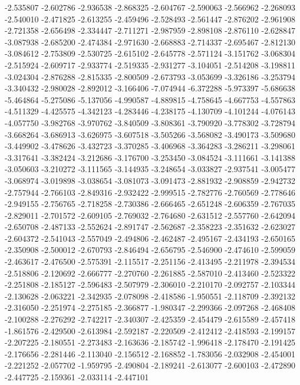 -2.535807
-2.602786
-2.936538
-2.868325
-2.604767
-2.590063
-2.566962
-2.268093
-2.540010
-2.471825
-2.613255
-2.459496
-2.528493
-2.561447
-2.876202
-2.961908
-2.721358
-2.656498
-2.334447
-2.711271
-2.987959
-2.898108
-2.876110
-2.628847
-3.087938
-2.685200
-2.474384
-2.971630
-2.668883
-2.714337
-2.695467
-2.812130
-3.084612
-2.753809
-2.530725
-2.615102
-2.645778
-2.571124
-3.151762
-3.068304
-2.515924
-2.609717
-2.933774
-2.519335
-2.931277
-3.104051
-2.514208
-3.198811
-3.024304
-2.876288
-2.815335
-2.800509
-2.673793
-3.053699
-3.326186
-3.253794
-3.340432
-2.980028
-2.892012
-3.166406
-7.074944
-6.372288
-5.973397
-5.686638
-5.464864
-5.275086
-5.137056
-4.990587
-4.889815
-4.758645
-4.667753
-4.557863
-4.511329
-4.425575
-4.342123
-4.283446
-4.238175
-4.130709
-4.101244
-4.076143
-4.057750
-3.982768
-3.970762
-3.840509
-3.808361
-3.790920
-3.778302
-3.728794
-3.668264
-3.686913
-3.626975
-3.607518
-3.505266
-3.568082
-3.490173
-3.509680
-3.449902
-3.478626
-3.432723
-3.370285
-3.406968
-3.364283
-3.286211
-3.298061
-3.317641
-3.382424
-3.212686
-3.176700
-3.253450
-3.084524
-3.111661
-3.141388
-3.050603
-3.210272
-3.111565
-3.144935
-3.248654
-3.033827
-2.937541
-3.005477
-3.068974
-3.019898
-3.038654
-3.081073
-3.091473
-2.881932
-2.908859
-2.942732
-2.757944
-2.766103
-2.849316
-2.932422
-2.999515
-2.782776
-2.760569
-2.778646
-2.949155
-2.756765
-2.718258
-2.730386
-2.666465
-2.651248
-2.606359
-2.767035
-2.829011
-2.701572
-2.609105
-2.769032
-2.764680
-2.631512
-2.557760
-2.642094
-2.650708
-2.487133
-2.552624
-2.891747
-2.562687
-2.358223
-2.351632
-2.623027
-2.604372
-2.541043
-2.557049
-2.494806
-2.462487
-2.495167
-2.434193
-2.650165
-2.350908
-2.500012
-2.670793
-2.846494
-2.656795
-2.546900
-2.474610
-2.599059
-2.463617
-2.476500
-2.575391
-2.115517
-2.251156
-2.413495
-2.211978
-2.394534
-2.518806
-2.120692
-2.666777
-2.270760
-2.261885
-2.587010
-2.413460
-2.523322
-2.251808
-2.185127
-2.596483
-2.507979
-2.306010
-2.210170
-2.092757
-2.103344
-2.130628
-2.063221
-2.342935
-2.078098
-2.418586
-1.950551
-2.118709
-2.392132
-2.316050
-2.251974
-2.275185
-2.366877
-1.980347
-2.299366
-2.097268
-2.468408
-2.100288
-2.276292
-2.742217
-2.340307
-2.425359
-2.454479
-2.615589
-2.457418
-1.861576
-2.429500
-2.613984
-2.592187
-2.220509
-2.412412
-2.418593
-2.199157
-2.207225
-2.180551
-2.273483
-2.163636
-2.185742
-1.996418
-2.178470
-2.191425
-2.176656
-2.281446
-2.113040
-2.156512
-2.168852
-1.783056
-2.032908
-2.454001
-2.221252
-2.057702
-1.959795
-2.490804
-2.189241
-2.613077
-2.600103
-2.472890
-2.447725
-2.159361
-2.033114
-2.447101
